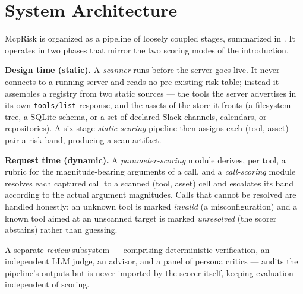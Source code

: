 \section{System Architecture}
\label{sec:framework:architecture}

McpRisk is organized as a pipeline of loosely coupled stages, summarized in
. It operates in two phases that mirror the two scoring
modes of the introduction.

\textbf{Design time (static).} A \emph{scanner} runs before the server goes
live. It never connects to a running server and reads no pre-existing risk
table; instead it assembles a registry from two static sources --- the tools
the server advertises in its own \texttt{tools/list} response, and the assets
of the store it fronts (a filesystem tree, a SQLite schema, or a set of
declared Slack channels, calendars, or repositories). A six-stage
\emph{static-scoring} pipeline then assigns each (tool, asset) pair a risk band,
producing a scan artifact.

\textbf{Request time (dynamic).} A \emph{parameter-scoring} module derives, per
tool, a rubric for the magnitude-bearing arguments of a call, and a
\emph{call-scoring} module resolves each captured call to a scanned (tool,
asset) cell and escalates its band according to the actual argument magnitudes.
Calls that cannot be resolved are handled honestly: an unknown tool is marked
\emph{invalid} (a misconfiguration) and a known tool aimed at an unscanned
target is marked \emph{unresolved} (the scorer abstains) rather than guessing.

A separate \emph{review} subsystem --- comprising deterministic verification, an
independent LLM judge, an advisor, and a panel of persona critics --- audits
the pipeline's outputs but is never imported by the scorer itself, keeping
evaluation independent of scoring.


